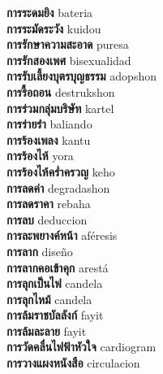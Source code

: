 \textbf{ การระดมยิง  } bateria \\
\textbf{ การระมัดระวัง  } kuidou \\
\textbf{ การรักษาความสะอาด  } puresa \\
\textbf{ การรักสองเพศ  } bisexualidad \\
\textbf{ การรับเลี้ยงบุตรบุญธรรม  } adopshon \\
\textbf{ การรื้อถอน  } destrukshon \\
\textbf{ การร่วมกลุ่มบริษัท  } kartel \\
\textbf{ การร่ายรำ  } baliando \\
\textbf{ การร้องเพลง  } kantu \\
\textbf{ การร้องไห้  } yora \\
\textbf{ การร้องไห้คร่ำครวญ  } keho \\
\textbf{ การลดค่า  } degradashon \\
\textbf{ การลดราคา  } rebaha \\
\textbf{ การลบ  } deduccion \\
\textbf{ การละพยางค์หน้า  } aféresis \\
\textbf{ การลาก  } diseño \\
\textbf{ การลากคอเข้าคุก  } arestá \\
\textbf{ การลุกเป็นไฟ  } candela \\
\textbf{ การลุกไหม้  } candela \\
\textbf{ การล้มราชบัลลังก์  } fayit \\
\textbf{ การล้มละลาย  } fayit \\
\textbf{ การวัดคลื่นไฟฟ้าหัวใจ  } cardiogram \\
\textbf{ การวางแผงหนังสือ  } circulacion \\

